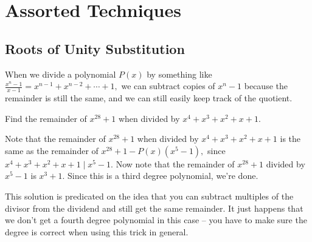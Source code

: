\documentclass{article}
\begin{document}
%
%

\section{Assorted Techniques}

\subsection{Roots of Unity Substitution}
When we divide a polynomial $P(x)$ by something like $\frac{x^n-1}{x-1}=x^{n-1}+x^{n-2}+\cdots+1,$ we can subtract copies of $x^n-1$ because the remainder is still the same, and we can still easily keep track of the quotient.

\begin{exam}
Find the remainder of $x^{28}+1$ when divided by $x^4+x^3+x^2+x+1.$
\end{exam}

\begin{sol}
Note that the remainder of $x^{28}+1$ when divided by $x^4+x^3+x^2+x+1$ is the same as the remainder of $x^{28}+1-P(x)(x^5-1),$ since $x^4+x^3+x^2+x+1\mid x^5-1.$ Now note that the remainder of $x^{28}+1$ divided by $x^5-1$ is $x^3+1.$ Since this is a third degree polynomial, we're done.
\end{sol}
This solution is predicated on the idea that you can subtract multiples of the divisor from the dividend and still get the same remainder. It just happens that we don't get a fourth degree polynomial in this case -- you have to make sure the degree is correct when using this trick in general.
\end{document}
